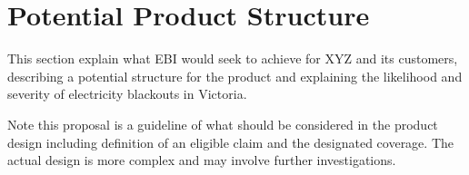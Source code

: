 \documentclass[12pt]{article}
\begin{document}
\section{Potential Product Structure}
\begin{flushleft}
This section explain what EBI would seek to achieve for XYZ and its customers, describing a potential structure for the product and explaining the likelihood and severity of electricity blackouts in Victoria.
\end{flushleft}
\fullboxbegin
Note this proposal is a guideline of what should be considered in the product design including definition of an eligible claim and the designated coverage. The actual design is more complex and may involve further investigations. \par
\fullboxend
\end{document}
